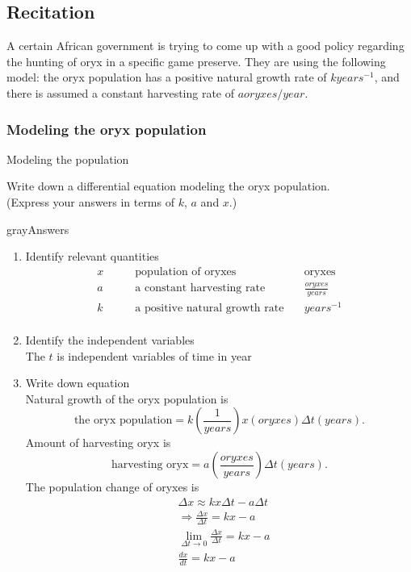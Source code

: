 \subsection{Recitation}
A certain African government is trying to come up with a good policy regarding
the hunting of oryx in a specific game preserve.
They are using the following model: the oryx population has a positive natural growth rate of
$k years^{-1}$, and there is assumed a constant harvesting rate of $a oryxes/year$.
\subsubsection{Modeling the oryx population}
\begin{problem}
  Modeling the population
\end{problem}
Write down a differential equation modeling the oryx population.\\
(Express your answers in terms of $k$, $a$ and $x$.)
\begin{mybox}{gray}{Answers}
  \begin{enumerate}
  \item Identify relevant quantities\\
    \begin{align*}
      \displaystyle x &\qquad \text{population of oryxes} &\quad  \text{oryxes} \\
      \displaystyle a &\qquad \text{a constant harvesting rate} &\quad  \frac{oryxes}{years} \\
      \displaystyle k &\qquad \text{a positive natural growth rate} &\quad  years^{-1}\\
    \end{align*}
  \item Identify the independent variables\\
    The $t$ is independent variables of time in year 
  \item Write down equation\\
    Natural growth of the oryx population is
    \begin{equation*}
      \displaystyle \text{the oryx population} = k(\frac{1}{years}) x(oryxes) \Delta t(years). 
    \end{equation*}
    Amount of harvesting oryx is
    \begin{equation*}
      \displaystyle \text{harvesting oryx} = a(\frac{oryxes}{years}) \Delta t(years).
    \end{equation*}
    The population change of oryxes is
    \begin{align*}
      &\displaystyle \Delta x \approx kx \Delta t - a \Delta t \\
      &\displaystyle \Rightarrow \frac{\Delta x}{\Delta t} = kx - a\\
      &\displaystyle \lim \limits _{\Delta t\rightarrow 0}\frac{\Delta x}{\Delta t} = kx - a\\
      &\displaystyle \frac{dx}{dt} = kx - a
    \end{align*}
  \end{enumerate}
\end{mybox}
